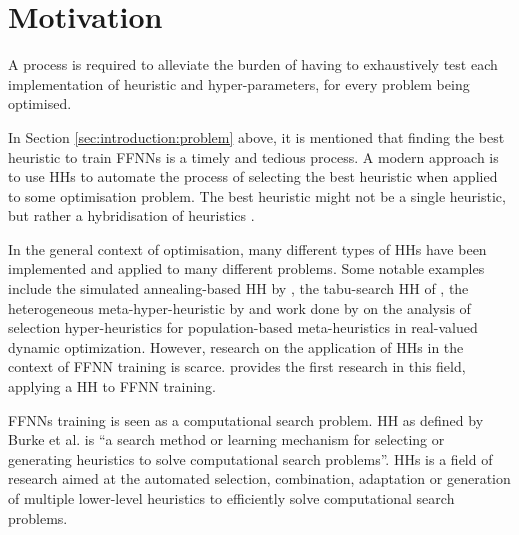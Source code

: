 \section{Motivation}\label{sec:introduction:motivation}

A process is required to alleviate the burden of having to exhaustively test each implementation of heuristic and hyper-parameters, for every problem being optimised.

In Section \ref{sec:introduction:problem} above, it is mentioned that finding the best heuristic to train \acp{FFNN} is a timely and tedious process. A modern approach is to use \acp{HH} to automate the process of selecting the best heuristic when applied to some optimisation problem. The best heuristic might not be a single heuristic, but rather a hybridisation of heuristics \cite{ref:pillay:2015}.

In the general context of optimisation, many different types of \acp{HH} have been implemented and applied to many different problems. Some notable examples include the simulated annealing-based \ac{HH} by \citeauthor{ref:dowsland:2007} \cite{ref:dowsland:2007}, the tabu-search \ac{HH} of \citeauthor{ref:burke:2010} \cite{ref:burke:2010}, the heterogeneous meta-hyper-heuristic by \citeauthor{ref:grobler:2012} \cite{ref:grobler:2012} and work done by \citeauthor{ref:vanderstockt:2018} \cite{ref:vanderstockt:2018} on the analysis of selection hyper-heuristics for population-based meta-heuristics in real-valued dynamic optimization. However, research on the application of \acp{HH} in the context of \acs{FFNN} training is scarce. \citeauthor{ref:nel:2021} \cite{ref:nel:2021} provides the first research in this field, applying a \acs{HH} to \acs{FFNN} training.

\acp{FFNN} training is seen as a computational search problem. \Acl{HH} as defined by Burke et al. \cite{ref:burke:2010} is ``a search method or learning mechanism for selecting or generating heuristics to solve computational search problems''. \acp{HH} is a field of research aimed at the automated selection, combination, adaptation or generation of multiple lower-level heuristics to efficiently solve computational search problems.

